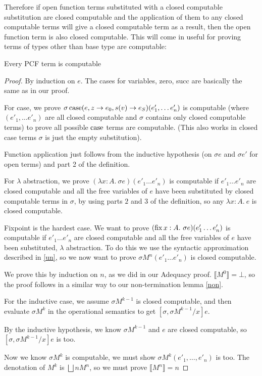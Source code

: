 Therefore if open function terms substituted with a closed computable substitution are closed computable and the application of them to any closed computable terms will give a closed computable term as a result, then the open function term is also closed computable. This will come in useful for proving terms of types other than base type are computable:

\vspace{0.5cm}

\begin{thm}
Every PCF term is computable
\end{thm}

\begin{proof}
By induction on $e$. The cases for variables, zero, succ are basically the same as in our proof.

For case, we prove $\sigma \operatorname{case}(e, z \to e_0, s(v) \to e_S)(e'_1, \dots e'_n)$ is computable (where $(e'_1, \dots e'_n)$ are all closed  computable and $\sigma$ contains only closed computable terms) to prove all possible $\operatorname{case}$ terms are computable. (This also works in closed case terms $\sigma$ is just the empty substitution).  

Function application just follows from the inductive hypothesis (on $\sigma e$ and $\sigma e'$ for open terms) and part 2 of the definition.

For $\lambda$ abstraction, we prove $(\lambda x:A. \ \sigma e)(e'_1 \dots e'_n)$ is computable if $e'_1 \dots e'_n$ are closed computable and all the free variables of $e$ have been substituted by closed computable terms in $\sigma$, by using parts $2$ and $3$ of the definition, so   any $\lambda x:A. \ e$ is closed computable.

Fixpoint is the hardest case. We want to prove $(\operatorname{fix} x:A. \ \sigma e)(e'_1 \dots e'_n)$ is computable if $e'_1 \dots e'_n$ are closed computable and all the free variables of $e$ have been substituted, $\lambda$ abstraction. To do this we use the syntactic approximation described in \ref{un}, so we now want to prove $\sigma M^n (e'_1 \dots e'_n)$ is closed computable.

We prove this by induction on $n$, as we did in our Adequacy proof. $\llbracket M^0 \rrbracket = \bot$, so the proof follows in a similar way to our non-termination lemma \ref{non}.

For the inductive case, we assume $\sigma M^{k-1}$ is closed computable, and then evaluate $\sigma M^k$ in the operational semantics to get $[\sigma, \sigma M^{k-1}/x]e$.

By the inductive hypothesis, we know $\sigma  M^{k-1}$ and $e$ are closed computable, so    $[\sigma, \sigma M^{k-1}/x]e$ is too.

Now we know $\sigma M^k$ is computable, we must show $\sigma M^k (e'_1, \dots, e'_n)$ is too. The denotation of $M^k$ is $\bigsqcup n M^n$, so we must prove $\llbracket M^n \rrbracket = n$
\end{proof}

